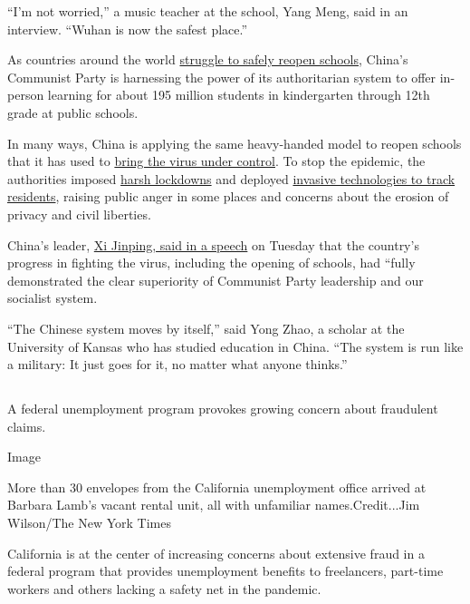 ``I'm not worried,'' a music teacher at the school, Yang Meng, said in
an interview. ``Wuhan is now the safest place.''

As countries around the world
\href{https://www.nytimes3xbfgragh.onion/2020/09/01/world/schools-reopen-globe-students.html}{struggle
to safely reopen schools}, China's Communist Party is harnessing the
power of its authoritarian system to offer in-person learning for about
195 million students in kindergarten through 12th grade at public
schools.

In many ways, China is applying the same heavy-handed model to reopen
schools that it has used to
\href{https://www.nytimes3xbfgragh.onion/2020/03/07/world/asia/china-coronavirus-cost.html}{bring
the virus under control}. To stop the epidemic, the authorities imposed
\href{https://www.nytimes3xbfgragh.onion/2020/02/06/world/asia/coronavirus-china-wuhan-quarantine.html}{harsh
lockdowns} and deployed
\href{https://www.nytimes3xbfgragh.onion/2020/05/26/technology/china-coronavirus-surveillance.html}{invasive
technologies to track residents}, raising public anger in some places
and concerns about the erosion of privacy and civil liberties.

China's leader,
\href{https://www.nytimes3xbfgragh.onion/2020/09/07/world/covid-19-coronavirus.html\#link-adc17f7}{Xi
Jinping, said in a speech} on Tuesday that the country's progress in
fighting the virus, including the opening of schools, had ``fully
demonstrated the clear superiority of Communist Party leadership and our
socialist system.

``The Chinese system moves by itself,'' said Yong Zhao, a scholar at the
University of Kansas who has studied education in China. ``The system is
run like a military: It just goes for it, no matter what anyone
thinks.''

\hypertarget{-9}{%
\subsection{}\label{-9}}

A federal unemployment program provokes growing concern about fraudulent
claims.

Image

More than 30 envelopes from the California unemployment office arrived
at Barbara Lamb's vacant rental unit, all with unfamiliar
names.Credit...Jim Wilson/The New York Times

California is at the center of increasing concerns about extensive fraud
in a federal program that provides unemployment benefits to freelancers,
part-time workers and others lacking a safety net in the pandemic.

